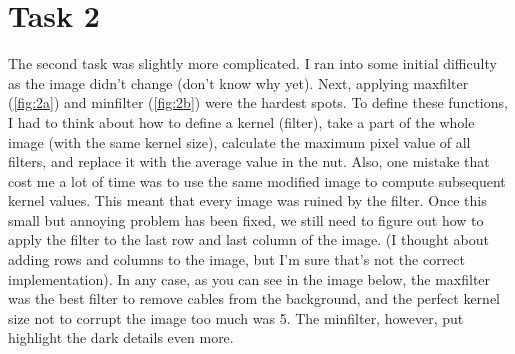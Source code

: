 \chapter{Task 2}
The second task was slightly more complicated. I ran into some initial difficulty as the image didn't change (don't know why yet). Next, applying maxfilter (\ref{fig:2a}) and minfilter (\ref{fig:2b}) were the hardest spots. To define these functions, I had to think about how to define a kernel (filter), take a part of the whole image (with the same kernel size), calculate the maximum pixel value of all filters, and replace it with the average value in the nut. Also, one mistake that cost me a lot of time was to use the same modified image to compute subsequent kernel values. This meant that every image was ruined by the filter. Once this small but annoying problem has been fixed, we still need to figure out how to apply the filter to the last row and last column of the image. (I thought about adding rows and columns to the image, but I'm sure that's not the correct implementation).
In any case, as you can see in the image below, the maxfilter was the best filter to remove cables from the background, and the perfect kernel size not to corrupt the image too much was 5. The minfilter, however, put highlight the dark details even more.

